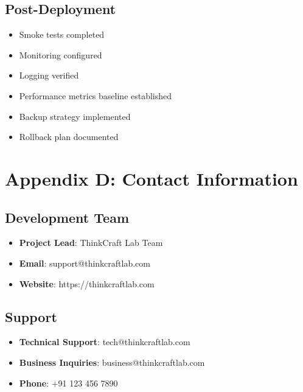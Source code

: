 \documentclass{scrreprt}
\begin{document}
\subsection{Post-Deployment}
\begin{itemize}
\item[$\square$] Smoke tests completed
\item[$\square$] Monitoring configured
\item[$\square$] Logging verified
\item[$\square$] Performance metrics baseline established
\item[$\square$] Backup strategy implemented
\item[$\square$] Rollback plan documented
\end{itemize}

\section{Appendix D: Contact Information}

\subsection{Development Team}
\begin{itemize}
\item \textbf{Project Lead}: ThinkCraft Lab Team
\item \textbf{Email}: support@thinkcraftlab.com
\item \textbf{Website}: https://thinkcraftlab.com
\end{itemize}

\subsection{Support}
\begin{itemize}
\item \textbf{Technical Support}: tech@thinkcraftlab.com
\item \textbf{Business Inquiries}: business@thinkcraftlab.com
\item \textbf{Phone}: +91 123 456 7890
\end{itemize}
\end{document}
